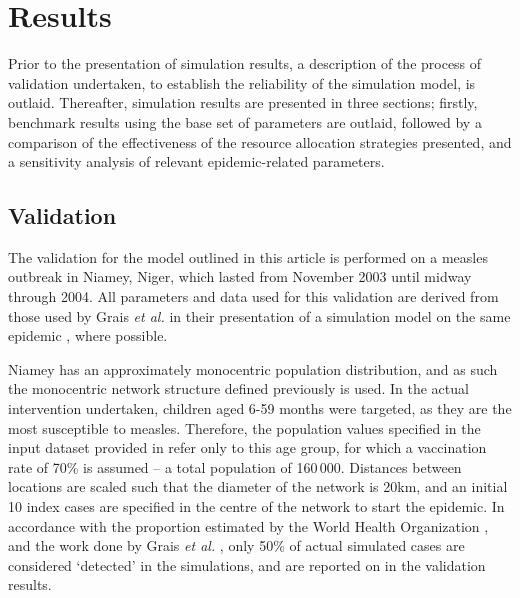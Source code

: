 \documentclass[10pt,letterpaper]{article}
\begin{document}
\section*{Results}
Prior to the presentation of simulation results, a description of the process of validation undertaken, to establish the reliability of the simulation model, is outlaid. Thereafter, simulation results are presented in three sections; firstly, benchmark results using the base set of parameters are outlaid, followed by a comparison of the effectiveness of the resource allocation strategies presented, and a sensitivity analysis of relevant epidemic-related parameters.

\subsection*{Validation}
\label{res:validation}
The validation for the model outlined in this article is performed on a measles outbreak in Niamey, Niger, which lasted from November 2003 until midway through 2004. 
All parameters and data used for this validation are derived from those used by Grais \textit{et al.} in their presentation of a simulation model on the same epidemic \cite{grais2008time}, where possible.

Niamey has an approximately monocentric population distribution, and as such the monocentric network structure defined previously is used. In the actual intervention undertaken, children aged 6-59 months were targeted, as they are the most susceptible to measles. Therefore, the population values specified in the input dataset provided in  refer only to this age group, for which a vaccination rate of 70\% is assumed -- a total population of 160\,000. Distances between locations are scaled such that the diameter of the network is 20km, and an initial 10 index cases are specified in the centre of the network to start the epidemic.
In accordance with the proportion estimated by the World Health Organization \cite{msf_1999}, and the work done by Grais \textit{et al.} \cite{grais2008time}, only 50\% of actual simulated cases are considered `detected' in the simulations, and are reported on in the validation results.
\end{document}
